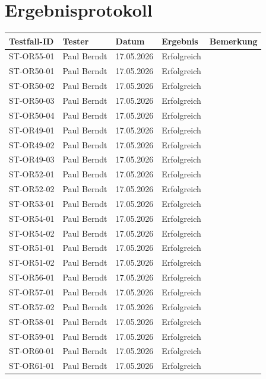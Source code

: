 \documentclass[a4paper,11pt]{article}
\begin{document}
\section{Ergebnisprotokoll}
\begin{longtable}{|p{2.2cm}|p{2cm}|p{2cm}|p{2cm}|p{5cm}|}
    \hline
    \textbf{Testfall-ID} & \textbf{Tester} & \textbf{Datum} & \textbf{Ergebnis} & \textbf{Bemerkung} \\ \hline
    ST-OR55-01 & Paul Berndt & 17.05.2026 & Erfolgreich & \\ \hline
    ST-OR50-01 & Paul Berndt & 17.05.2026 & Erfolgreich & \\ \hline
    ST-OR50-02 & Paul Berndt & 17.05.2026 & Erfolgreich & \\ \hline
    ST-OR50-03 & Paul Berndt & 17.05.2026 & Erfolgreich & \\ \hline
    ST-OR50-04 & Paul Berndt & 17.05.2026 & Erfolgreich & \\ \hline
    ST-OR49-01 & Paul Berndt & 17.05.2026 & Erfolgreich & \\ \hline
    ST-OR49-02 & Paul Berndt & 17.05.2026 & Erfolgreich & \\ \hline
    ST-OR49-03 & Paul Berndt & 17.05.2026 & Erfolgreich & \\ \hline
    ST-OR52-01 & Paul Berndt & 17.05.2026 & Erfolgreich & \\ \hline
    ST-OR52-02 & Paul Berndt & 17.05.2026 & Erfolgreich & \\ \hline
    ST-OR53-01 & Paul Berndt & 17.05.2026 & Erfolgreich & \\ \hline
    ST-OR54-01 & Paul Berndt & 17.05.2026 & Erfolgreich & \\ \hline
    ST-OR54-02 & Paul Berndt & 17.05.2026 & Erfolgreich & \\ \hline
    ST-OR51-01 & Paul Berndt & 17.05.2026 & Erfolgreich & \\ \hline
    ST-OR51-02 & Paul Berndt & 17.05.2026 & Erfolgreich & \\ \hline
    ST-OR56-01 & Paul Berndt & 17.05.2026 & Erfolgreich & \\ \hline
    ST-OR57-01 & Paul Berndt & 17.05.2026 & Erfolgreich & \\ \hline
    ST-OR57-02 & Paul Berndt & 17.05.2026 & Erfolgreich & \\ \hline
    ST-OR58-01 & Paul Berndt & 17.05.2026 & Erfolgreich & \\ \hline
    ST-OR59-01 & Paul Berndt & 17.05.2026 & Erfolgreich & \\ \hline
    ST-OR60-01 & Paul Berndt & 17.05.2026 & Erfolgreich & \\ \hline
    ST-OR61-01 & Paul Berndt & 17.05.2026 & Erfolgreich & \\ \hline
\end{longtable}
\end{document}
